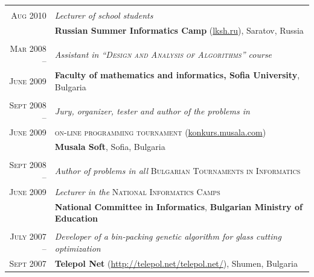 \documentclass[a4paper,10pt]{article}
\def\myline{\color{linegray}\vline}
\newcommand{\minorcolor}[1]{\textcolor{mygray}{#1}}
\begin{document}
{\begin{tabular}{r!{\myline}p{14cm}}
        \\
	\textsc{Aug 2010}         &  \textit{Lecturer of school students}\\
	                          &  \textbf{Russian Summer Informatics Camp} (\href{http://lksh.ru/}{lksh.ru}), Saratov, Russia\vspace{-5mm}\\
	
	\\
	\textsc{Mar 2008 --}      &  \textit{Assistant in \textsc{``Design and Analysis of Algorithms''} course}\\
	\textsc{June 2009}        &  \textbf{Faculty of mathematics and informatics, Sofia University}, Bulgaria\\

	\\
	\textsc{Sept 2008 --}     &  \textit{Jury, organizer, tester and \textit{author} of the problems in}\\
	\textsc{June 2009}        &  \textsc{on-line programming tournament} (\href{http://konkurs.musala.com/}{konkurs.musala.com})\\
	                          &  \textbf{Musala Soft}, Sofia, Bulgaria\\

	\\
	\textsc{Sept 2008 --}     &  \textit{Author of problems in all} \textsc{Bulgarian Tournaments in Informatics}\\
	\textsc{June 2009}        &  \textit{Lecturer in the} \textsc{National Informatics Camps}\\
                                  &  \textbf{National Committee in Informatics}, \textbf{Bulgarian Ministry of Education}\\

	\\
	\textsc{July 2007 --}     &  \textit{Developer of a bin-packing genetic algorithm for glass cutting optimization}\\
	\textsc{Sept 2007}        &  \textbf{Telepol Net} (\href{http://telepol.net/telepol.net/}{http://telepol.net/telepol.net/}), Shumen, Bulgaria\\
	
\end{tabular}

}
\end{document}
